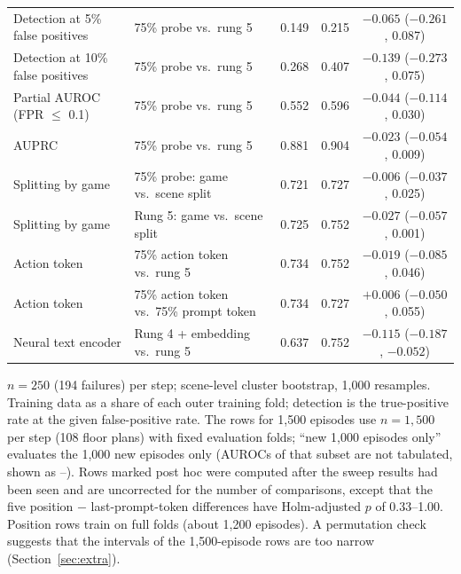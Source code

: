\begin{table}[htbp]
\begin{tabularx}{\linewidth}{@{}LLccc@{}}
Detection at 5\% false positives & 75\% probe vs.\ rung 5 & 0.149 & 0.215 & $-0.065$ ($-0.261$, 0.087) \\
Detection at 10\% false positives & 75\% probe vs.\ rung 5 & 0.268 & 0.407 & $-0.139$ ($-0.273$, 0.075) \\
Partial AUROC (FPR $\le$ 0.1) & 75\% probe vs.\ rung 5 & 0.552 & 0.596 & $-0.044$ ($-0.114$, 0.030) \\
AUPRC & 75\% probe vs.\ rung 5 & 0.881 & 0.904 & $-0.023$ ($-0.054$, 0.009) \\
Splitting by game & 75\% probe: game vs.\ scene split & 0.721 & 0.727 & $-0.006$ ($-0.037$, 0.025) \\
Splitting by game & Rung 5: game vs.\ scene split & 0.725 & 0.752 & $-0.027$ ($-0.057$, 0.001) \\
Action token & 75\% action token vs.\ rung 5 & 0.734 & 0.752 & $-0.019$ ($-0.085$, 0.046) \\
Action token & 75\% action token vs.\ 75\% prompt token & 0.734 & 0.727 & $+0.006$ ($-0.050$, 0.055) \\
Neural text encoder & Rung 4 + embedding vs.\ rung 5 & 0.637 & 0.752 & $-0.115$ ($-0.187$, $-0.052$) \\
\bottomrule
\end{tabularx}
\par\smallskip\raggedright\footnotesize
$n = 250$ (194 failures) per step; scene-level cluster bootstrap, 1,000 resamples. Training data as a share of each outer training fold; detection is the true-positive rate at the given false-positive rate. The rows for 1,500 episodes use $n = 1{,}500$ per step (108 floor plans) with fixed evaluation folds; ``new 1,000 episodes only'' evaluates the 1,000 new episodes only (AUROCs of that subset are not tabulated, shown as --). Rows marked post hoc were computed after the sweep results had been seen and are uncorrected for the number of comparisons, except that the five position $-$ last-prompt-token differences have Holm-adjusted $p$ of 0.33--1.00. Position rows train on full folds (about 1,200 episodes). A permutation check suggests that the intervals of the 1,500-episode rows are too narrow (Section~\ref{sec:extra}).
\end{table}
